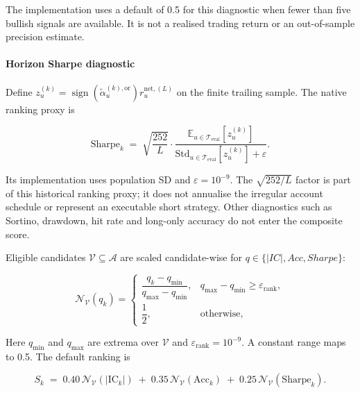 The implementation uses a default of 0.5 for this diagnostic when fewer than five bullish signals are available. It is not a realised trading return or an out-of-sample precision estimate.

\paragraph{Horizon Sharpe diagnostic}
Define $z^{(k)}_u=\operatorname{sign}(\tilde{\alpha}^{(k),\mathrm{or}}_u)r^{\mathrm{net},(L)}_u$ on the finite trailing sample. The native ranking proxy is

\begin{equation}
    \mathrm{Sharpe}_k \;=\;
    \sqrt{\frac{252}{L}} \cdot
    \frac{
        \mathbb{E}_{u\in\mathcal{T}_{\mathrm{eval}}}\!\left[z^{(k)}_u\right]
    }{
        \mathrm{Std}_{u\in\mathcal{T}_{\mathrm{eval}}}\!\left[z^{(k)}_u\right]
        + \varepsilon
    }.
    \label{eq:sharpe}
\end{equation}


Its implementation uses population SD and $\varepsilon=10^{-9}$. The $\sqrt{252/L}$ factor is part of this historical ranking proxy; it does not annualise the irregular account schedule or represent an executable short strategy. Other diagnostics such as Sortino, drawdown, hit rate and long-only accuracy do not enter the composite score.

Eligible candidates $\mathcal{V}\subseteq\mathcal{A}$ are scaled candidate-wise for $q\in\{|IC|,Acc,Sharpe\}$:

\begin{equation}
    \mathcal{N}_{\mathcal{V}}(q_k) =
    \begin{cases}
        \dfrac{q_k-q_{\min}}{q_{\max}-q_{\min}},
        & q_{\max}-q_{\min} \geq \varepsilon_{\mathrm{rank}},\\[6pt]
        \dfrac{1}{2}, & \text{otherwise},
    \end{cases}
    \label{eq:candidate_minmax}
\end{equation}


Here $q_{\min}$ and $q_{\max}$ are extrema over $\mathcal{V}$ and $\varepsilon_{\mathrm{rank}}=10^{-9}$. A constant range maps to 0.5. The default ranking is

\begin{equation}
    S_k \;=\;
    0.40\,\mathcal{N}_{\mathcal{V}}(|\mathrm{IC}_k|)
    \;+\; 0.35\,\mathcal{N}_{\mathcal{V}}(\mathrm{Acc}_k)
    \;+\; 0.25\,\mathcal{N}_{\mathcal{V}}(\mathrm{Sharpe}_k).
    \label{eq:composite}
\end{equation}


